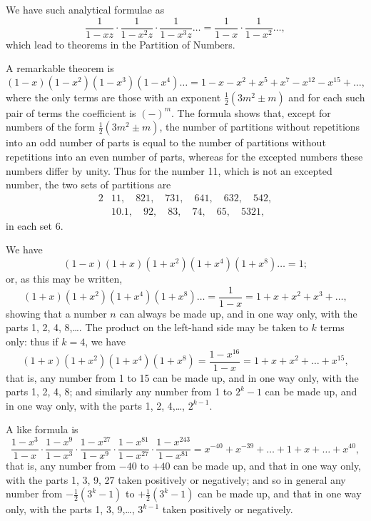 \documentclass[11pt,a4paper]{book}
\begin{document}
We have such analytical formulae as
\[
\frac{1}{1 - xz} \cdot \frac{1}{1 - x^{2}z} \cdot \frac{1}{1 - x^{3}z} \ldots = \frac{1}{1 - x} \cdot \frac{1}{1 - x^{2}} \ldots,
\]
which lead to theorems in the Partition of Numbers.

A remarkable theorem is
\[
(1 - x)(1 - x^{2})(1 - x^{3})(1 - x^{4})\ldots = 1 - x - x^{2} + x^{5} + x^{7} - x^{12} - x^{15} + \ldots,
\]
where the only terms are those with an exponent $\frac{1}{2}(3m^{2} \pm m)$ and for each such pair of terms the coefficient is $(-)^{m}$. The formula shows that, except for numbers of the form $\frac{1}{2}(3m^{2} \pm m)$, the number of partitions without repetitions into an odd number of parts is equal to the number of partitions without repetitions into an even number of parts, whereas for the excepted numbers these numbers differ by unity. Thus for the number 11, which is not an excepted number, the two sets of partitions are
\begin{alignat*}{2}
&11, \quad 821, \quad 731, \quad 641, \quad 632, \quad 542, \\
&10.1, \quad 92, \quad 83, \quad 74, \quad 65, \quad 5321,
\end{alignat*}
in each set 6.

We have
\[
(1 - x)(1 + x)(1 + x^{2})(1 + x^{4})(1 + x^{8})\ldots = 1;
\]
or, as this may be written,
\[
(1 + x)(1 + x^{2})(1 + x^{4})(1 + x^{8})\ldots = \frac{1}{1 - x} = 1 + x + x^{2} + x^{3} + \ldots,
\]
showing that a number $n$ can always be made up, and in one way only, with the parts 1, 2, 4, 8,\ldots. The product on the left-hand side may be taken to $k$ terms only: thus if $k = 4$, we have
\[
(1 + x)(1 + x^{2})(1 + x^{4})(1 + x^{8}) = \frac{1 - x^{16}}{1 - x} = 1 + x + x^{2} + \ldots + x^{15},
\]
that is, any number from 1 to 15 can be made up, and in one way only, with the parts 1, 2, 4, 8; and similarly any number from 1 to $2^{k} - 1$ can be made up, and in one way only, with the parts 1, 2, 4,\ldots, $2^{k-1}$.

A like formula is
\[
\frac{1 - x^{3}}{1 - x} \cdot \frac{1 - x^{9}}{1 - x^{3}} \cdot \frac{1 - x^{27}}{1 - x^{9}} \cdot \frac{1 - x^{81}}{1 - x^{27}} \cdot \frac{1 - x^{243}}{1 - x^{81}} = x^{-40} + x^{-39} + \ldots + 1 + x + \ldots + x^{40},
\]
that is, any number from $-40$ to $+40$ can be made up, and that in one way only, with the parts 1, 3, 9, 27 taken positively or negatively; and so in general any number from $-\frac{1}{2}(3^{k} - 1)$ to $+\frac{1}{2}(3^{k} - 1)$ can be made up, and that in one way only, with the parts 1, 3, 9,\ldots, $3^{k-1}$ taken positively or negatively.
\end{document}
